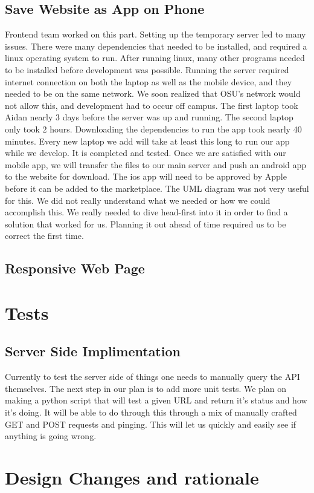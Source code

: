 \documentclass[12pt]{article}
\begin{document}
      \subsection{Save Website as App on Phone}
      Frontend team worked on this part.  Setting up the temporary server led to many issues. There were many dependencies that needed to be installed, and required a linux operating system to run. After running linux, many other programs needed to be installed before development was possible. Running the server required internet connection on both the laptop as well as the mobile device, and they needed to be on the same network. We soon realized that OSU’s network would not allow this, and development had to occur off campus. The first laptop took Aidan nearly 3 days before the server was up and running. The second laptop only took 2 hours. Downloading the dependencies to run the app took nearly 40 minutes. Every new laptop we add will take at least this long to run our app while we develop. It is completed and tested. Once we are satisfied with our mobile app, we will transfer the files to our main server and push an android app to the website for download. The ios app will need to be approved by Apple before it can be added to the marketplace. The UML diagram was not very useful for this. We did not really understand what we needed or how we could accomplish this. We really needed to dive head-first into it in order to find a solution that worked for us. Planning it out ahead of time required us to be correct the first time.
      \subsection{Responsive Web Page}
\section{Tests}
\subsection{Server Side Implimentation}
Currently to test the server side of things one needs to manually query the API themselves.  The next step in our plan is to add more unit tests.  We plan on making a python script that will test a given URL and return it's status and how it's doing.  It will be able to do through this through a mix of manually crafted GET and POST requests and pinging.  This will let us quickly and easily see if anything is going wrong.
\section{Design Changes and rationale}
\end{document}
